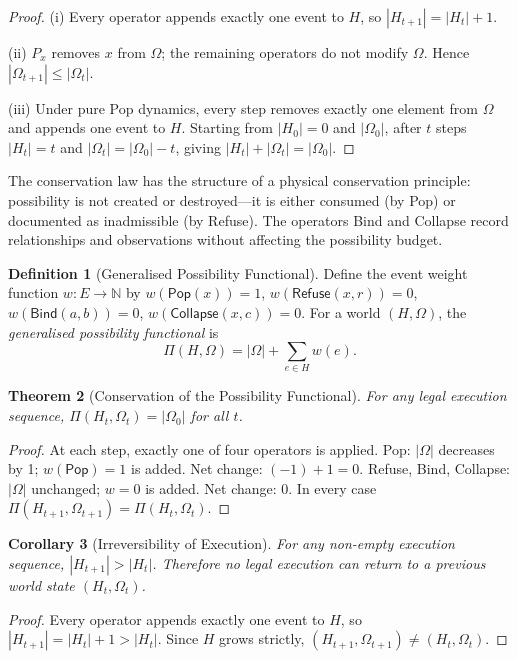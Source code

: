 \documentclass[12pt, a4paper, openany]{book}
\theoremstyle{plain}
\newtheorem{theorem}{Theorem}[chapter]
\newtheorem{corollary}[theorem]{Corollary}
\theoremstyle{definition}
\newtheorem{definition}[theorem]{Definition}
\theoremstyle{remark}
\newcommand{\Pop}{\mathsf{Pop}}
\newcommand{\Refuse}{\mathsf{Refuse}}
\newcommand{\Bind}{\mathsf{Bind}}
\newcommand{\Collapse}{\mathsf{Collapse}}
\begin{document}
\begin{proof}
(i) Every operator appends exactly one event to $H$, so $|H_{t+1}| = |H_t| + 1$.

(ii) $P_x$ removes $x$ from $\Omega$; the remaining operators do not modify
$\Omega$. Hence $|\Omega_{t+1}| \leq |\Omega_t|$.

(iii) Under pure Pop dynamics, every step removes exactly one element from $\Omega$
and appends one event to $H$. Starting from $|H_0| = 0$ and $|\Omega_0|$, after
$t$ steps $|H_t| = t$ and $|\Omega_t| = |\Omega_0| - t$, giving
$|H_t| + |\Omega_t| = |\Omega_0|$.
\end{proof}

The conservation law has the structure of a physical conservation principle:
possibility is not created or destroyed---it is either consumed (by Pop) or
documented as inadmissible (by Refuse). The operators Bind and Collapse record
relationships and observations without affecting the possibility budget.

\begin{definition}[Generalised Possibility Functional]
Define the event weight function $w : E \to \mathbb{N}$ by $w(\Pop(x)) = 1$,
$w(\Refuse(x,r)) = 0$, $w(\Bind(a,b)) = 0$, $w(\Collapse(x,c)) = 0$. For a
world $(H, \Omega)$, the \emph{generalised possibility functional} is
\[
\Pi(H, \Omega) = |\Omega| + \sum_{e \in H} w(e).
\]
\end{definition}

\begin{theorem}[Conservation of the Possibility Functional]
For any legal execution sequence, $\Pi(H_t, \Omega_t) = |\Omega_0|$ for all $t$.
\end{theorem}

\begin{proof}
At each step, exactly one of four operators is applied. Pop: $|\Omega|$ decreases
by 1; $w(\Pop) = 1$ is added. Net change: $(-1) + 1 = 0$. Refuse, Bind, Collapse:
$|\Omega|$ unchanged; $w = 0$ is added. Net change: $0$. In every case
$\Pi(H_{t+1}, \Omega_{t+1}) = \Pi(H_t, \Omega_t)$.
\end{proof}

\begin{corollary}[Irreversibility of Execution]
For any non-empty execution sequence, $|H_{t+1}| > |H_t|$. Therefore no legal
execution can return to a previous world state $(H_t, \Omega_t)$.
\end{corollary}

\begin{proof}
Every operator appends exactly one event to $H$, so $|H_{t+1}| = |H_t| + 1 > |H_t|$.
Since $H$ grows strictly, $(H_{t+1}, \Omega_{t+1}) \neq (H_t, \Omega_t)$.
\end{proof}
\end{document}
